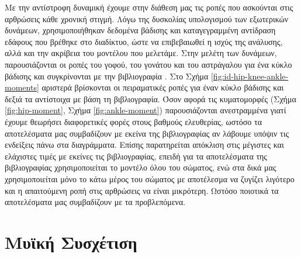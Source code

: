 Με την αντίστροφη δυναμική έχουμε στην διάθεση μας τις ροπές που ασκούνται στις αρθρώσεις κάθε χρονική στιγμή. Λόγω της δυσκολίας υπολογισμού των εξωτερικών δυνάμεων, χρησιμοποιήθηκαν δεδομένα βάδισης και καταγεγραμμένη αντίδραση εδάφους που βρέθηκε στο διαδίκτυο, ώστε να επιβεβαιωθεί η ισχύς της ανάλυσης, αλλά και την ακρίβεια του μοντέλου που μελετάμε. Στην μελέτη των δυνάμεων, παρουσιάζονται οι ροπές του γοφού, του γονάτου και του αστράγαλου για ένα κύκλο βάδισης και συγκρίνονται με την βιβλιογραφία \cite{whittlesey}. Στο Σχήμα \ref{fig:id-hip-knee-ankle-moments} αριστερά βρίσκονται οι πειραματικές ροπές για έναν κύκλο βάδισης και δεξιά τα αντίστοιχα με βάση τη βιβλιογραφία. Όσον αφορά τις κυματομορφές (Σχήμα \ref{fig:hip-moment}, Σχήμα \ref{fig:ankle-moment}) παρουσιάζονται ανεστραμμένα  γιατί έχουμε θεωρήσει διαφορετικές φορές στους βαθμούς ελευθερίας, ωστόσο τα αποτελέσματα μας συμβαδίζουν με εκείνα της βιβλιογραφίας αν λάβουμε υπόψιν τις ενδείξεις πάνω στα διαγράμματα. Επίσης παρατηρείται απόκλιση στις μέγιστες και ελάχιστες τιμές με εκείνες τις βιβλιογραφίας, επειδή για τα αποτελέσματα της βιβλιογραφίας χρησιμοποιείται το μοντέλο όλου του σώματος, ενώ στα δικά μας χρησιμοποιείται μόνο το κάτω μέρος του σώματος με αποτέλεσμα να ζυγίζει λιγότερο και η απαιτούμενη ροπή στις αρθρώσεις να είναι μικρότερη. Ωστόσο ποιοτικά τα αποτελέσματα μας συμβαδίζουν με τα προβλεπόμενα.


\section{Μυϊκή Συσχέτιση}

